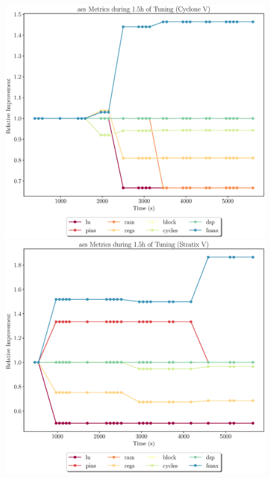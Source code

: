 \documentclass[12pt, a4paper]{article}
\begin{document}
\newpage

\begin{figure}[htpb]
    \centering
    \begin{minipage}{.48\textwidth}
        \centering
        \includegraphics[scale=.29]{aes_all_5400_chstone_CycloneV}
    \end{minipage}%
    \hfill
    \begin{minipage}{.48\textwidth}
        \centering
        \includegraphics[scale=.29]{aes_all_5400_chstone_StratixV}
    \end{minipage}%


\end{figure}
\end{document}
